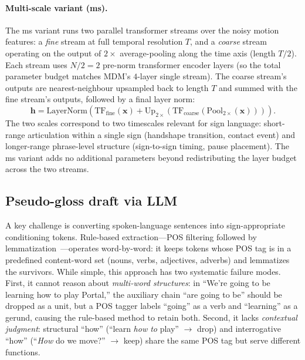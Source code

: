 \documentclass{article}
\begin{document}
\paragraph{Multi-scale variant (ms).}
The ms variant runs two parallel transformer streams over the noisy motion features: a \emph{fine} stream at full temporal resolution $T$, and a \emph{coarse} stream operating on the output of $2{\times}$ average-pooling along the time axis (length $T/2$). Each stream uses $N/2{=}2$ pre-norm transformer encoder layers (so the total parameter budget matches MDM's $4$-layer single stream). The coarse stream's outputs are nearest-neighbour upsampled back to length $T$ and summed with the fine stream's outputs, followed by a final layer norm:
\begin{equation}
    \mathbf{h} = \text{LayerNorm}\!\left(\text{TF}_{\text{fine}}(\mathbf{x}) + \text{Up}_{2\times}\!\left(\text{TF}_{\text{coarse}}(\text{Pool}_{2\times}(\mathbf{x}))\right)\right).
\end{equation}
The two scales correspond to two timescales relevant for sign language: short-range articulation within a single sign (handshape transition, contact event) and longer-range phrase-level structure (sign-to-sign timing, pause placement). The ms variant adds no additional parameters beyond redistributing the layer budget across the two streams.

\subsection{Pseudo-gloss draft via LLM}
\label{sec:draft}

A key challenge is converting spoken-language sentences into sign-appropriate conditioning tokens.
Rule-based extraction---POS filtering followed by lemmatization~\citep{zheng2023sign2gpt}---operates word-by-word: it keeps tokens whose POS tag is in a predefined content-word set (nouns, verbs, adjectives, adverbs) and lemmatizes the survivors.
While simple, this approach has two systematic failure modes.
First, it cannot reason about \emph{multi-word structures}: in ``We're going to be learning how to play Portal,'' the auxiliary chain ``are going to be'' should be dropped as a unit, but a POS tagger labels ``going'' as a verb and ``learning'' as a gerund, causing the rule-based method to retain both.
Second, it lacks \emph{contextual judgment}: structural ``how'' (``learn \emph{how to} play'' $\to$ drop) and interrogative ``how'' (``\emph{How} do we move?'' $\to$ keep) share the same POS tag but serve different functions.
\end{document}
